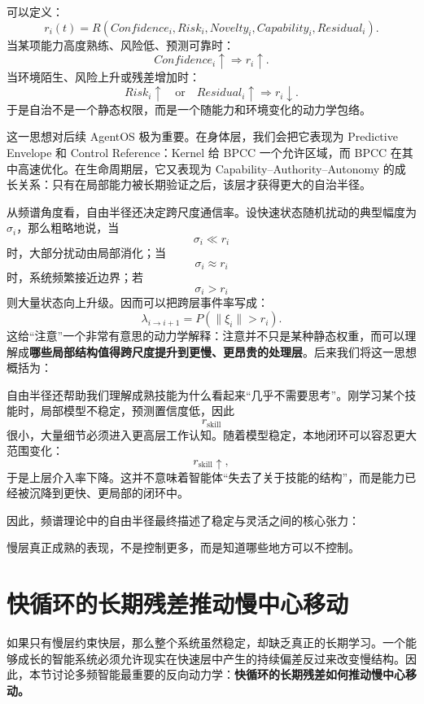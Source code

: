 可以定义：
\[
r_i(t)
=
R
\left(
Confidence_i,
Risk_i,
Novelty_i,
Capability_i,
Residual_i
\right).
\]
当某项能力高度熟练、风险低、预测可靠时：
\[
Confidence_i\uparrow
\Rightarrow
r_i\uparrow.
\]
当环境陌生、风险上升或残差增加时：
\[
Risk_i\uparrow
\quad\text{or}\quad
Residual_i\uparrow
\Rightarrow
r_i\downarrow.
\]
于是自治不是一个静态权限，而是一个随能力和环境变化的动力学包络。

这一思想对后续 AgentOS 极为重要。在身体层，我们会把它表现为 Predictive Envelope 和 Control Reference：Kernel 给 BPCC 一个允许区域，而 BPCC 在其中高速优化。在生命周期层，它又表现为 Capability--Authority--Autonomy 的成长关系：只有在局部能力被长期验证之后，该层才获得更大的自治半径。

从频谱角度看，自由半径还决定跨尺度通信率。设快速状态随机扰动的典型幅度为 $\sigma_i$，那么粗略地说，当
\[
\sigma_i
\ll
r_i
\]
时，大部分扰动由局部消化；当
\[
\sigma_i
\approx
r_i
\]
时，系统频繁接近边界；若
\[
\sigma_i
>
r_i
\]
则大量状态向上升级。因而可以把跨层事件率写成：
\[
\lambda_{i\rightarrow i+1}
=
P
\left(
\|\xi_i\|>r_i
\right).
\]
这给“注意”一个非常有意思的动力学解释：注意并不只是某种静态权重，而可以理解成\textbf{哪些局部结构值得跨尺度提升到更慢、更昂贵的处理层}。后来我们将这一思想概括为：
\begin{statementbox}
\centering
{}
\end{statementbox}

自由半径还帮助我们理解成熟技能为什么看起来“几乎不需要思考”。刚学习某个技能时，局部模型不稳定，预测置信度低，因此
\[
r_{\mathrm{skill}}
\]
很小，大量细节必须进入更高层工作认知。随着模型稳定，本地闭环可以容忍更大范围变化：
\[
r_{\mathrm{skill}}\uparrow,
\]
于是上层介入率下降。这并不意味着智能体“失去了关于技能的结构”，而是能力已经被沉降到更快、更局部的闭环中。

因此，频谱理论中的自由半径最终描述了稳定与灵活之间的核心张力：
\begin{statementbox}
\centering
{}
\end{statementbox}
慢层真正成熟的表现，不是控制更多，而是知道哪些地方可以不控制。

\section{快循环的长期残差推动慢中心移动}

如果只有慢层约束快层，那么整个系统虽然稳定，却缺乏真正的长期学习。一个能够成长的智能系统必须允许现实在快速层中产生的持续偏差反过来改变慢结构。因此，本节讨论多频智能最重要的反向动力学：\textbf{快循环的长期残差如何推动慢中心移动。}


